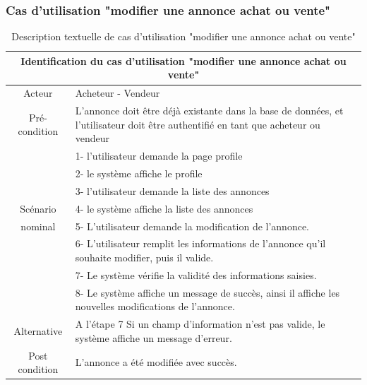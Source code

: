 \documentclass[edit,12pt,a4paper,ChapStyle,oneside,doubleinterligne]{report}
\begin{document}
\subsubsection{Cas d'utilisation "modifier une annonce achat ou vente"}
\begin{table}[h!]
    \centering
    \begin{tabular}{|c|m{10cm}|}
    \hline
         \multicolumn{2}{|c|}{Identification du cas d'utilisation "modifier une annonce achat ou vente" }\\
         \hline
         Acteur & Acheteur - Vendeur\\
         \hline
         Pré-condition & L’annonce doit être déjà existante dans la base de données, et l'utilisateur doit être authentifié en tant que acheteur ou vendeur \\
         \hline
          & 1- l'utilisateur demande la page profile\\
          & 2- le système affiche le profile\\
          & 3- l'utilisateur demande la liste des annonces\\
          Scénario& 4- le système affiche la liste des annonces\\
          nominal& 5- L’utilisateur demande la modification de l’annonce. \\
          & 6- L’utilisateur remplit les informations de l’annonce qu’il souhaite modifier, puis il valide.\\
          & 7- Le système vérifie la validité des informations saisies.\\
          & 8- Le système affiche un message de succès, ainsi il affiche les nouvelles modifications de l’annonce.\\
         \hline
         Alternative  & A l’étape 7 Si un champ d’information n’est pas valide, le
         système affiche un message d’erreur. \\
         \hline
         Post condition &  L'annonce a été modifiée avec succès.\\
         \hline
    \end{tabular}
    \caption{Description textuelle de cas d'utilisation "modifier une annonce achat ou vente" }
    \label{tab:cas 7}
\end{table}
\end{document}
